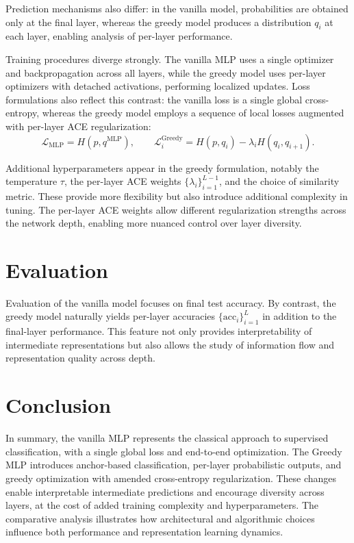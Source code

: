 \documentclass[11pt]{article}
\begin{document}
Prediction mechanisms also differ: in the vanilla model, probabilities are obtained only at the final layer, whereas the greedy model produces a distribution $q_i$ at each layer, enabling analysis of per-layer performance.

Training procedures diverge strongly. The vanilla MLP uses a single optimizer and backpropagation across all layers, while the greedy model uses per-layer optimizers with detached activations, performing localized updates. Loss formulations also reflect this contrast: the vanilla loss is a single global cross-entropy, whereas the greedy model employs a sequence of local losses augmented with per-layer ACE regularization:
\[
  \mathcal{L}_{\text{MLP}} = H(p, q^{\text{MLP}}), \qquad
  \mathcal{L}_i^{\text{Greedy}} = H(p, q_i) - \lambda_i H(q_i, q_{i+1}).
\]

Additional hyperparameters appear in the greedy formulation, notably the temperature $\tau$, the per-layer ACE weights $\{\lambda_i\}_{i=1}^{L-1}$, and the choice of similarity metric. These provide more flexibility but also introduce additional complexity in tuning. The per-layer ACE weights allow different regularization strengths across the network depth, enabling more nuanced control over layer diversity.

\section{Evaluation}
Evaluation of the vanilla model focuses on final test accuracy. By contrast, the greedy model naturally yields per-layer accuracies $\{\mathrm{acc}_i\}_{i=1}^L$ in addition to the final-layer performance. This feature not only provides interpretability of intermediate representations but also allows the study of information flow and representation quality across depth.

\section{Conclusion}
In summary, the vanilla MLP represents the classical approach to supervised classification, with a single global loss and end-to-end optimization. The Greedy MLP introduces anchor-based classification, per-layer probabilistic outputs, and greedy optimization with amended cross-entropy regularization. These changes enable interpretable intermediate predictions and encourage diversity across layers, at the cost of added training complexity and hyperparameters. The comparative analysis illustrates how architectural and algorithmic choices influence both performance and representation learning dynamics.
\end{document}
